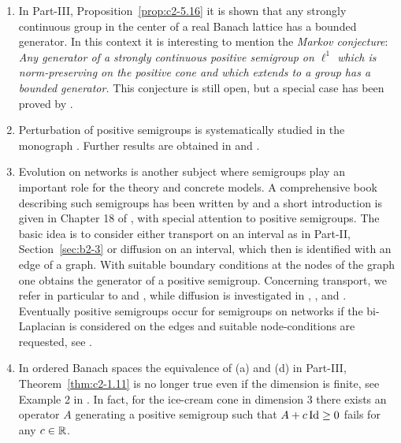 \begin{enumerate}
\item
In Part-III, Proposition~\ref{prop:c2-5.16} it is shown that any strongly continuous group in the center of a real Banach lattice has a bounded generator. 
In this context it is interesting to mention the \emph{Markov conjecture}: \textit{Any generator of a strongly continuous positive semigroup on $\ell^{1}$ which is norm-preserving on the positive cone and which extends to a group has a bounded generator.} 
This conjecture is still open, but a special case has been proved by \textcite{zbmath07367032}.

\item

Perturbation of positive semigroups is systematically studied in the monograph 
\textcite{zbmath05030445}. Further results are obtained in  \textcite{zbmath07971662}  and \textcite{zbmath08137521}.
\item 
Evolution on networks is another subject where semigroups play an important role for the theory and concrete models. 
A comprehensive book describing such semigroups has been written by \textcite{zbmath06255542} and a short introduction is given in Chapter 18 of \textcite{zbmath06695787}, with special attention to positive semigroups. The basic idea is to consider either transport on an interval as in 
Part-II, Section~\ref{sec:b2-3} or diffusion on an interval, which then is identified with an edge of a graph.  With suitable boundary conditions at the nodes of the graph one obtains the generator of a positive semigroup. Concerning transport, we refer in particular to \textcite{zbmath05773159} and \textcite{zbmath05010468}, while diffusion is investigated in  \textcite{zbmath05180115}, \textcite{zbmath05244453}, \textcite{zbmath07952050} and \textcite{zbmath05167359}.
Eventually positive semigroups occur for semigroups on networks if the bi-Laplacian is considered on the edges and suitable node-conditions are requested, see \textcite{zbmath07189579}.

\item 
In ordered Banach spaces the equivalence of \upshape(a) and \upshape(d) in  Part-III, Theorem~\ref{thm:c2-1.11} is no longer true even if the dimension is finite, see Example 2 in \textcite{zbmath01146453}. 
In fact, for the ice-cream cone in dimension 3 there exists an operator $A$ generating a positive semigroup such that 
$A + c \Id \geq 0$ fails for any $c \in \mathbb{R}$.
\end{enumerate}
